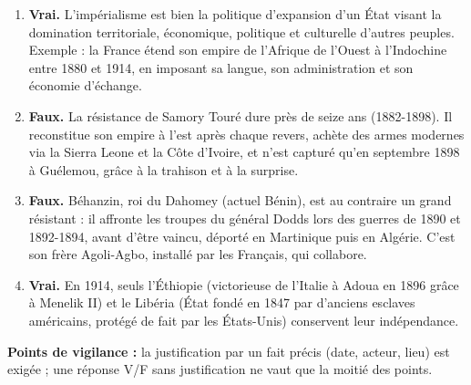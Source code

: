 \documentclass[11pt]{article}
\begin{document}
\begin{corrige}
\begin{enumerate}
    \item \textbf{Vrai.} L'impérialisme est bien la politique d'expansion d'un État visant la domination territoriale, économique, politique et culturelle d'autres peuples. Exemple : la France étend son empire de l'Afrique de l'Ouest à l'Indochine entre 1880 et 1914, en imposant sa langue, son administration et son économie d'échange.
    \item \textbf{Faux.} La résistance de Samory Touré dure près de seize ans (1882-1898). Il reconstitue son empire à l'est après chaque revers, achète des armes modernes via la Sierra Leone et la Côte d'Ivoire, et n'est capturé qu'en septembre 1898 à Guélemou, grâce à la trahison et à la surprise.
    \item \textbf{Faux.} Béhanzin, roi du Dahomey (actuel Bénin), est au contraire un grand résistant : il affronte les troupes du général Dodds lors des guerres de 1890 et 1892-1894, avant d'être vaincu, déporté en Martinique puis en Algérie. C'est son frère Agoli-Agbo, installé par les Français, qui collabore.
    \item \textbf{Vrai.} En 1914, seuls l'Éthiopie (victorieuse de l'Italie à Adoua en 1896 grâce à Menelik II) et le Libéria (État fondé en 1847 par d'anciens esclaves américains, protégé de fait par les États-Unis) conservent leur indépendance.
\end{enumerate}
\textbf{Points de vigilance :} la justification par un fait précis (date, acteur, lieu) est exigée ; une réponse V/F sans justification ne vaut que la moitié des points.
\end{corrige}
\end{document}
